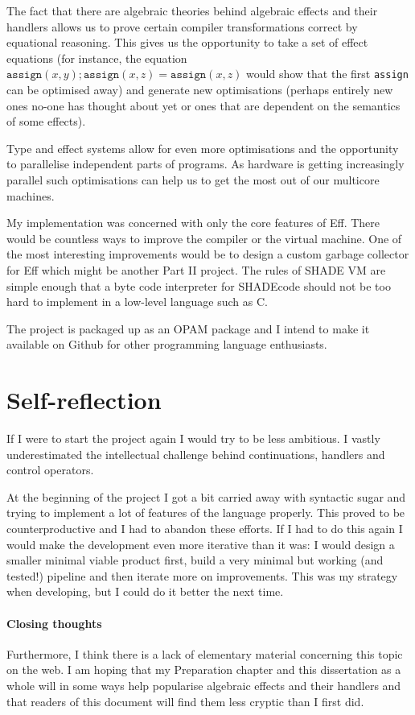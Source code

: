 \documentclass[class=article, crop=false]{standalone}
\begin{document}
The fact that there are algebraic theories behind algebraic effects and their
handlers allows us to prove certain compiler transformations correct by
equational reasoning. This gives us the opportunity to take a set of effect
equations (for instance, the equation $\mathtt{assign}(x,y); \mathtt{assign}(x,z) =
\mathtt{assign}(x, z)$ would show that the first \texttt{assign} can be optimised
away) and generate new optimisations (perhaps entirely new ones no-one has
thought about yet or ones that are dependent on the semantics of some effects).

Type and effect systems \cite{bauer2013effect} allow for even more optimisations
and the opportunity to parallelise independent parts of programs. As hardware is
getting increasingly parallel such optimisations can help us to get the most out
of our multicore machines.

My implementation was concerned with only the core features of Eff. There would
be countless ways to improve the compiler or the virtual machine. One of the
most interesting improvements would be to design a custom garbage collector for
Eff which might be another Part II project. The rules of SHADE VM are simple
enough that a byte code interpreter for SHADEcode should not be too hard to
implement in a low-level language such as C.

The project is packaged up as an OPAM package and I intend to make it available
on Github for other programming language enthusiasts.


\section{Self-reflection}

If I were to start the project again I would try to be less ambitious. I vastly
underestimated the intellectual challenge behind continuations, handlers and
control operators.

At the beginning of the project I got a bit carried away with syntactic sugar
and trying to implement a lot of features of the language properly. This proved
to be counterproductive and I had to abandon these efforts. If I had to do this
again I would make the development even more iterative than it was: I would
design a smaller minimal viable product first, build a very minimal but working
(and tested!) pipeline and then iterate more on improvements. This was my
strategy when developing, but I could do it better the next time.

\paragraph{Closing thoughts}

Furthermore, I think there is a lack of elementary material concerning this
topic on the web. I am hoping that my Preparation chapter and this dissertation
as a whole will in some ways help popularise algebraic effects and their
handlers and that readers of this document will find them less cryptic than I
first did.
\end{document}
